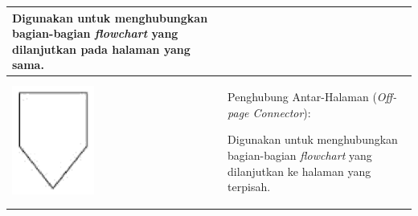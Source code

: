\begin{longtable}[c]{|>{\centering}m{4cm}|>{\raggedright}m{9.5cm}|}
Digunakan untuk menghubungkan bagian-bagian \emph{flowchart} yang
dilanjutkan pada halaman yang sama.\tabularnewline
\hline 
\includegraphics[totalheight=1.9cm]{images/flow_offcon} & Penghubung Antar-Halaman (\emph{Off-page Connector}):

Digunakan untuk menghubungkan bagian-bagian \emph{flowchart} yang
dilanjutkan ke halaman yang terpisah.\tabularnewline
\hline 
\end{longtable}